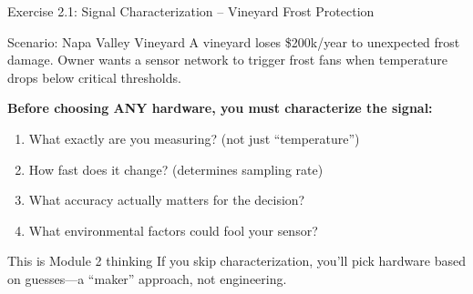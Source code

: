 \documentclass[aspectratio=169,11pt]{beamer}
\begin{document}
\begin{frame}{Exercise 2.1: Signal Characterization -- Vineyard Frost Protection}
    \begin{block}{Scenario: Napa Valley Vineyard}
        A vineyard loses \$200k/year to unexpected frost damage. Owner wants a sensor network to trigger frost fans when temperature drops below critical thresholds.
        
        \vspace{0.2cm}
        \textbf{Before choosing ANY hardware, you must characterize the signal:}
        \begin{enumerate}
            \item What exactly are you measuring? (not just ``temperature'')
            \item How fast does it change? (determines sampling rate)
            \item What accuracy actually matters for the decision?
            \item What environmental factors could fool your sensor?
        \end{enumerate}
    \end{block}
    
    \vspace{0.2cm}
    \begin{alertblock}{This is Module 2 thinking}
        If you skip characterization, you'll pick hardware based on guesses---a ``maker'' approach, not engineering.
    \end{alertblock}
\end{frame}
\end{document}
